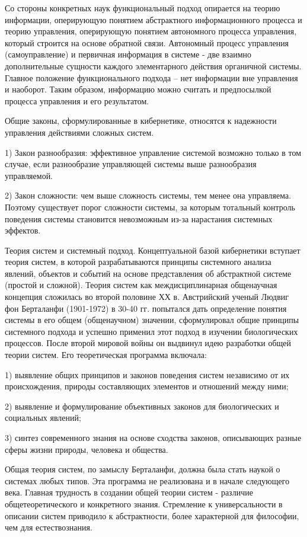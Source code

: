 \documentclass[exam_answers.tex]{subfiles}
\begin{document}
Со стороны конкретных наук функциональный подход опирается на
теорию информации, оперирующую понятием абстрактного информационного
процесса и теорию управления, оперирующую понятием автономного процесса
управления, который строится на основе обратной связи. Автономный процесс
управления (самоуправление) и первичная информация в системе - две взаимно
дополнительные сущности каждого элементарного действия органичной
системы. Главное положение функционального подхода – нет информации вне
управления и наоборот. Таким образом, информацию можно считать и
предпосылкой процесса управления и его результатом.

Общие законы, сформулированные в кибернетике, относятся к надежности
управления действиями сложных систем.

1) Закон разнообразия: эффективное управление системой возможно
только в том случае, если разнообразие управляющей системы выше
разнообразия управляемой.

2) Закон сложности: чем выше сложность системы, тем менее она
управляема. Поэтому существует порог сложности системы, за которым
тотальный контроль поведения системы становится невозможным из-за
нарастания системных эффектов.

Теория систем и системный подход. Концептуальной базой кибернетики
вступает теория систем, в которой разрабатываются принципы системного
анализа явлений, объектов и событий на основе представления об абстрактной
системе (простой и сложной). Теория систем как междисциплинарная
общенаучная концепция сложилась во второй половине ХХ в. Австрийский
ученый Людвиг фон Берталанфи (1901-1972) в 30-40 гг. попытался дать
определение понятия системы в его общем (общенаучном) значении,
сформулировал общие принципы системного подхода и успешно применил
этот подход в изучении биологических процессов. После второй мировой
войны он выдвинул идею разработки общей теории систем. Его теоретическая
программа включала:

1) выявление общих принципов и законов поведения систем независимо
от их происхождения, природы составляющих элементов и отношений между
ними;

2) выявление и формулирование объективных законов для
биологических и социальных явлений;

3) синтез современного знания на основе сходства законов,
описывающих разные сферы жизни природы, человека и общества. 

Общая теория систем, по замыслу Берталанфи, должна была стать наукой
о системах любых типов. Эта программа не реализована и в начале следующего
века. Главная трудность в создании общей теории систем - различие
общетеоретического и конкретного знания. Стремление к универсальности в
описании систем приводило к абстрактности, более характерной для
философии, чем для естествознания.
\end{document}
